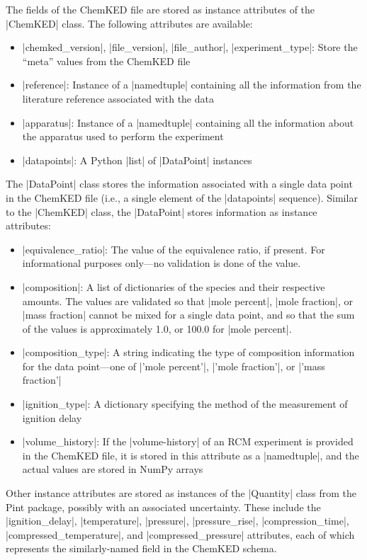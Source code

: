 \documentclass[12pt]{ijck}
\newcommand\ck{ChemKED}
\begin{document}
The fields of the \ck{} file are stored as instance attributes of the
\pybox|ChemKED| class. The following attributes are available:
%
\begin{itemize}
    \item \pybox|chemked_version|, \pybox|file_version|, \pybox|file_author|,
    \pybox|experiment_type|: Store the ``meta'' values from the \ck{} file
    \item \pybox|reference|: Instance of a \pybox|namedtuple| containing all
    the information from the literature reference associated with the data
    \item \pybox|apparatus|: Instance of a \pybox|namedtuple| containing all
    the information about the apparatus used to perform the experiment
    \item \pybox|datapoints|: A Python \pybox|list| of \pybox|DataPoint| instances
\end{itemize}

The \pybox|DataPoint| class stores the information associated with a single data
point in the \ck{} file (i.e., a single element of the \yabox|datapoints|
sequence). Similar to the \pybox|ChemKED| class,
the \pybox|DataPoint| stores information as instance attributes:
%
\begin{itemize}
    \item \pybox|equivalence_ratio|: The value of the equivalence ratio, if
    present. For informational purposes only---no validation is done of the
    value.
    \item \pybox|composition|: A list of dictionaries of the species and their
    respective amounts. The values are validated so that \yabox|mole percent|,
    \yabox|mole fraction|, or \yabox|mass fraction| cannot be mixed for a single
    data point, and so that the sum of the values is approximately 1.0, or
    100.0 for \yabox|mole percent|.
    \item \pybox|composition_type|: A string indicating the type of composition
    information for the data point---one of \pybox|'mole percent'|,
    \pybox|'mole fraction'|, or \pybox|'mass fraction'|
    \item \pybox|ignition_type|: A dictionary specifying the method of the
    measurement of ignition delay
    \item \pybox|volume_history|: If the \yabox|volume-history| of an RCM
    experiment is provided in the \ck{} file, it is stored in this attribute as
    a \pybox|namedtuple|, and the actual values are stored in NumPy arrays
    \autocite{vanderWalt:2011np}
\end{itemize}
%
Other instance attributes are stored as instances of the \pybox|Quantity| class from the
Pint \autocite{Grecco2016} package, possibly with an associated uncertainty. These include the
\pybox|ignition_delay|, \pybox|temperature|, \pybox|pressure|, \pybox|pressure_rise|,
\pybox|compression_time|, \pybox|compressed_temperature|, and \pybox|compressed_pressure|
attributes, each of which represents the similarly-named field in the \ck{} schema.
\end{document}
